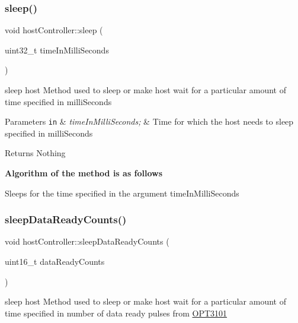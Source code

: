 \subsubsection{\texorpdfstring{sleep()}{sleep()}}
{\footnotesize\ttfamily void host\+Controller\+::sleep (\begin{DoxyParamCaption}\item[{uint32\+\_\+t}]{time\+In\+Milli\+Seconds }\end{DoxyParamCaption})}



sleep host Method used to sleep or make host wait for a particular amount of time specified in milli\+Seconds 


\begin{DoxyParams}[1]{Parameters}
\mbox{\tt in}  & {\em time\+In\+Milli\+Seconds;} & Time for which the host needs to sleep specified in milli\+Seconds \\
\hline
\end{DoxyParams}
\begin{DoxyReturn}{Returns}
Nothing 
\end{DoxyReturn}
{\bfseries Algorithm of the method is as follows}


\begin{DoxyItemize}
\item Sleeps for the time specified in the argument time\+In\+Milli\+Seconds 
\end{DoxyItemize}\mbox{\label{classhost_controller_aa678c25de9014a442ed33a4db695aeb3}} 
\subsubsection{\texorpdfstring{sleep\+Data\+Ready\+Counts()}{sleepDataReadyCounts()}}
{\footnotesize\ttfamily void host\+Controller\+::sleep\+Data\+Ready\+Counts (\begin{DoxyParamCaption}\item[{uint16\+\_\+t}]{data\+Ready\+Counts }\end{DoxyParamCaption})}



sleep host Method used to sleep or make host wait for a particular amount of time specified in number of data ready pulses from \mbox{\hyperlink{namespace_o_p_t3101}{O\+P\+T3101}} 


